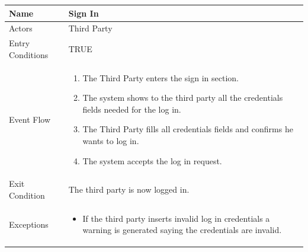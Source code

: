 \begin{enumerate}
\FloatBarrier
\begin{table}[h]
\begin{tabular}{|l|p{}|}
\hline
Name             & Sign In \\ \hline
Actors           & Third Party  \\ \hline
Entry Conditions & TRUE   \\ \hline
Event Flow       & \begin{enumerate}
            \item The Third Party enters the sign in section.
            \item The system shows to the third party all the credentials fields needed for the log in.
            \item The Third Party fills all credentials fields and confirms he wants to log in.
            \item The system accepts the log in request.
        \end{enumerate}\\ \hline
Exit Condition   & The third party is now logged in.\\ \hline
Exceptions       & \begin{itemize}
\item If the third party inserts invalid log in credentials a warning is generated saying the credentials are invalid.
\end{itemize}\\ \hline
\end{tabular}
\end{table}
\FloatBarrier


\end{enumerate}
